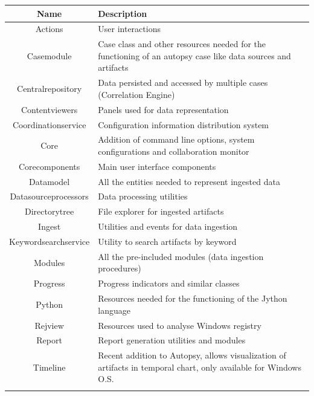 \begin{tabularx}{\textwidth}{@{}|c| *1{>{\centering\arraybackslash}X}@{}|}
    \hline
    \textbf{Name} & \textbf{Description} \\
    \hline\hline
    Actions & User interactions  \\
    \hline
    Casemodule & Case class and other resources needed for the functioning of an autopsy case like data sources and artifacts \\
    \hline
    Centralrepository & Data persisted and accessed by multiple cases (Correlation Engine) \\
    \hline
    Contentviewers & Panels used for data representation  \\
    \hline
    Coordinationservice & Configuration information distribution system \\
    \hline
    Core & Addition of command line options, system configurations and collaboration monitor  \\
    \hline
    Corecomponents & Main user interface components \\
    \hline
    Datamodel & All the entities needed to represent ingested data \\
    \hline
    Datasourceprocessors & Data processing utilities  \\
    \hline
    Directorytree & File explorer for ingested artifacts \\
    \hline
    Ingest & Utilities and events for data ingestion  \\
    \hline
    Keywordsearchservice & Utility to search artifacts by keyword  \\
    \hline
    Modules & All the pre-included modules (data ingestion procedures) \\
    \hline
    Progress & Progress indicators and similar classes \\
    \hline
    Python & Resources needed for the functioning of the Jython language \\
    \hline
    Rejview & Resources used to analyse Windows registry \\
    \hline
    Report & Report generation utilities and modules \\
    \hline
    Timeline & Recent addition to Autopsy, allows visualization of artifacts in temporal chart, only available for Windows O.S. \\
    \hline
    \caption{Autopsy Modules Overview}
    \label{tab:autopsyOverview}
\end{tabularx}

